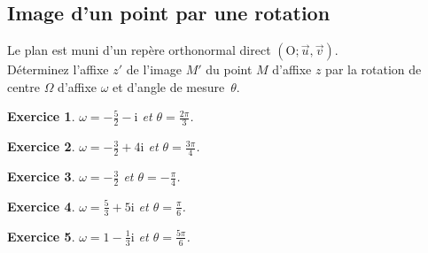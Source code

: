 \documentclass[a4paper]{article}
\newtheorem{Exercice}{Exercice}
\begin{document}
\begin{minipage}{0.40\linewidth}
\vspace{0.5cm}
\begin{center}
\subsection*{Image d'un point par une rotation}
\end{center}%
\vspace{0.5cm}
Le plan est muni d'un rep\`ere orthonormal direct $\left(\mathrm{O};\vec{u},\vec{v}\right)$.\\D\'eterminez l'affixe $z'$ de l'image $M'$ du point $M$ d'affixe $z$ par la rotation de centre $\Omega$ d'affixe $\omega$ et d'angle de mesure~$\theta$.
\begin{Exercice}
$\displaystyle \omega=-\frac{5}{2}-\mathrm{i}$ et $\displaystyle\theta=\frac{2 \pi }{3}$.
\end{Exercice}\begin{Exercice}
$\displaystyle \omega=-\frac{3}{2}+4\mathrm{i}$ et $\displaystyle\theta=\frac{3 \pi }{4}$.
\end{Exercice}\begin{Exercice}
$\displaystyle \omega=-\frac{3}{2}$ et $\displaystyle\theta=-\frac{\pi }{4}$.
\end{Exercice}\begin{Exercice}
$\displaystyle \omega=\frac{5}{3}+5\mathrm{i}$ et $\displaystyle\theta=\frac{\pi }{6}$.
\end{Exercice}\begin{Exercice}
$\displaystyle \omega=1-\frac{1}{3}\mathrm{i}$ et $\displaystyle\theta=\frac{5 \pi }{6}$.
\end{Exercice}
\end{minipage}
\hfill%
\end{document}

